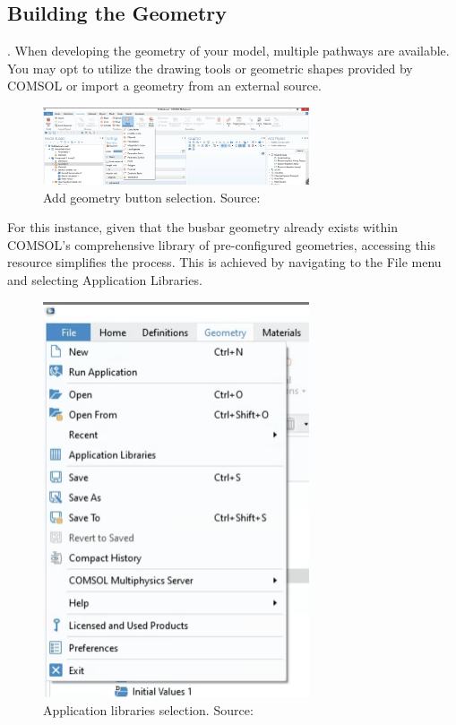 \subsection{Building the Geometry}.
When developing the geometry of your model, multiple pathways are available. You may opt to utilize the drawing tools or geometric shapes provided by COMSOL or import a geometry from an external source.

\begin{figure}[H]
  \centering
  \includegraphics[width=0.7\textwidth]{Chapters/Figures/Chapter 3 Figures/Geometry Tab.png}
  \caption{Add geometry button selection. Source: \cite{multiphysics__modeling_nodate}}
  \label{fig:Add geometry button selection.}
\end{figure}

For this instance, given that the busbar geometry already exists within COMSOL's comprehensive library of pre-configured geometries, accessing this resource simplifies the process. This is achieved by navigating to the File menu and selecting Application Libraries.

\begin{figure}[H]
  \centering
  \includegraphics[width=0.7\textwidth]{Chapters/Figures/Chapter 3 Figures/Application Libraries Button.png}
  \caption{Application libraries selection. Source: \cite{multiphysics__modeling_nodate}}
  \label{fig:"application libraries" selection}
\end{figure}

